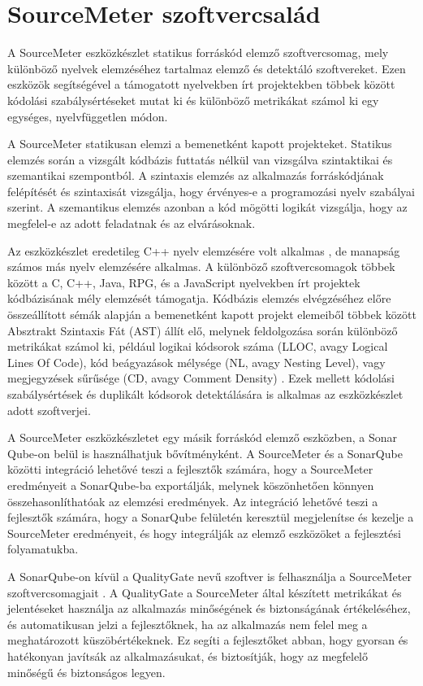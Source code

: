 \chapter{SourceMeter szoftvercsalád}
\label{chap:fejezet2}

A SourceMeter eszközkészlet statikus forráskód elemző szoftvercsomag, mely különböző nyelvek elemzéséhez tartalmaz elemző és detektáló szoftvereket. Ezen eszközök segítségével a támogatott nyelvekben írt projektekben többek között kódolási szabálysértéseket mutat ki és különböző metrikákat számol ki egy egységes, nyelvfüggetlen módon.

A SourceMeter statikusan elemzi a bemenetként kapott projekteket. 
Statikus elemzés során a vizsgált kódbázis futtatás nélkül van vizsgálva szintaktikai és szemantikai szempontból. A szintaxis elemzés az alkalmazás forráskódjának felépítését és szintaxisát vizsgálja, hogy érvényes-e a programozási nyelv szabályai szerint. A szemantikus elemzés azonban a kód mögötti logikát vizsgálja, hogy az megfelel-e az adott feladatnak és az elvárásoknak. 

Az eszközkészlet eredetileg C++ nyelv elemzésére volt alkalmas \cite{1167764}, de manapság számos más nyelv elemzésére alkalmas. A különböző szoftvercsomagok többek között a C, C++, Java, RPG, és a JavaScript nyelvekben írt projektek kódbázisának mély elemzését támogatja.
Kódbázis elemzés elvégzéséhez előre összeállított sémák alapján a bemenetként kapott projekt elemeiből többek között Absztrakt Szintaxis Fát (AST) állít elő, melynek feldolgozása során különböző metrikákat számol ki, például logikai kódsorok száma (LLOC, avagy Logical Lines Of Code), kód beágyazások mélysége (NL, avagy Nesting Level), vagy megjegyzések sűrűsége (CD, avagy Comment Density) \cite{siket2014differences}. Ezek mellett kódolási szabálysértések és duplikált kódsorok detektálására is alkalmas az eszközkészlet adott szoftverjei.

A SourceMeter eszközkészletet egy másik forráskód elemző eszközben, a Sonar Qube-on belül is használhatjuk bővítményként. A SourceMeter és a SonarQube közötti integráció lehetővé teszi a fejlesztők számára, hogy a SourceMeter eredményeit a SonarQube-ba exportálják, melynek köszönhetően könnyen összehasonlíthatóak az elemzési eredmények. Az integráció lehetővé teszi a fejlesztők számára, hogy a SonarQube felületén keresztül megjelenítse és kezelje a SourceMeter eredményeit, és hogy integrálják az elemző eszközöket a fejlesztési folyamatukba.

A SonarQube-on kívül a QualityGate nevű szoftver is felhasználja a SourceMeter szoftvercsomagjait \cite{6747214}. A QualityGate a SourceMeter által készített metrikákat és jelentéseket használja az alkalmazás minőségének és biztonságának értékeléséhez, és automatikusan jelzi a fejlesztőknek, ha az alkalmazás nem felel meg a meghatározott küszöbértékeknek. Ez segíti a fejlesztőket abban, hogy gyorsan és hatékonyan javítsák az alkalmazásukat, és biztosítják, hogy az megfelelő minőségű és biztonságos legyen.


